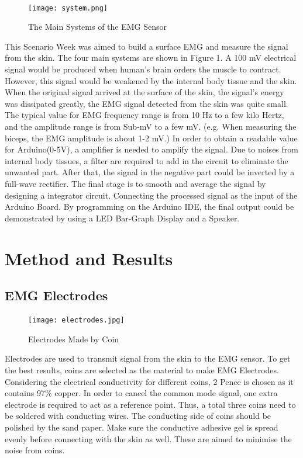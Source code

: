 \documentclass[12pt]{article}
\begin{document}
    \paragraph{}
    \begin{figure}[H]
            \centering
            \texttt{[image: system.png]}
            \caption{The Main Systems of the EMG Sensor}
        \end{figure}
    This Scenario Week was aimed to build a surface EMG and measure the signal from the skin. The four main systems are shown in Figure 1. A 100 mV electrical signal would be produced when human's brain orders the muscle to contract. However, this signal would be weakened by the internal body tissue and the skin. When the original signal arrived at the surface of the skin, the signal's energy was dissipated greatly, the EMG signal detected from the skin was quite small. The typical value for EMG frequency range is from 10 Hz to a few kilo Hertz, and the amplitude range is from Sub-mV to a few mV. (e.g. When measuring the biceps, the EMG amplitude is about 1-2 mV.) In order to obtain a readable value for Arduino(0-5V), a amplifier is needed to amplify the signal. Due to noises from internal body tissues, a filter are required to add in the circuit to eliminate the unwanted part.  After that, the signal in the negative part could be inverted by a full-wave rectifier. The final stage is to smooth and average the signal by designing a integrator circuit. Connecting the processed signal as the input of the Arduino Board. By programming on the Arduino IDE, the final output could be demonstrated by using a LED Bar-Graph Display and a Speaker.
   
    \section{Method and Results}
    \subsection{EMG Electrodes}
    \paragraph{}
    \begin{wrapfigure}{c}{2.5cm}
    \texttt{[image: electrodes.jpg]}
    \caption{Electrodes Made by Coin}
    \end{wrapfigure}
    Electrodes are used to transmit signal from the skin to the EMG sensor. To get the best results, coins are selected as the material to make EMG Electrodes. Considering the electrical conductivity for different coins, 2 Pence is chosen as it contains 97\% copper\cite{4}. In order to cancel the common mode signal, one extra electrode is required to act as a reference point. Thus, a total three coins need to be soldered with conducting wires. The conducting side of coins should be polished by the sand paper. Make sure the conductive adhesive gel is spread evenly before connecting with the skin as well. These are aimed to minimise the noise from coins.
    
\end{document}
